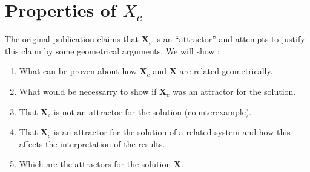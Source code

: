 \documentclass[journal abbreviation, manuscript]{copernicus}
\theoremstyle{definition}
\newcommand{\X}{\mathbf{X}}
\begin{document}
\section{Properties of $X_c$ }
The original publication \citep[p. 150 after eq.8b ]{Luo2017Biogeosciences} claims that $\X_c$ is an ``attractor'' and attempts to justify this claim by some geometrical arguments.
We will show : 
\begin{enumerate}
\item
What can be proven about how $\X_c$ and $\X$ are related geometrically.
\item
What would be necessarry to show if $\X_c$ was an attractor for the solution.
\item
That $\X_c$ is not an attractor for the solution (counterexample).
\item \label{frozen}
That $\X_c$ is an attractor for the solution of a related system and how this affects the interpretation of the results.
\item \label{pullback}
Which are the attractors for the solution $\X$.
\end{enumerate}
\end{document}

